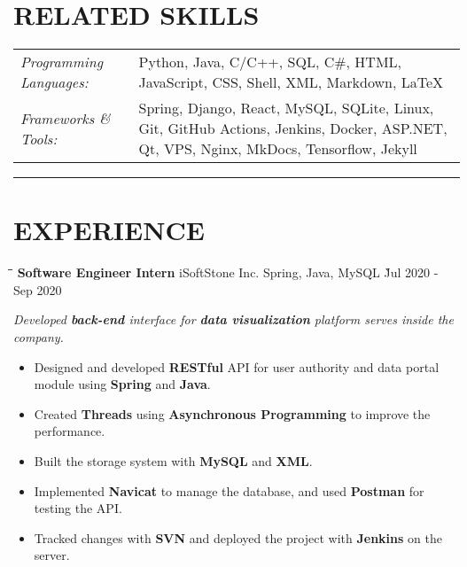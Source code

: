 \documentclass{res}
\begin{document}
\begin{resume}
\vspace{-0.2in}
\section{RELATED SKILLS}  
    \vspace{+0.15in}
    \hspace{-0.12in} 
    \begin{tabular}{l p{4.6in}}
    {\sl Programming Languages:} & Python, Java, C/C++, SQL, C\#, HTML, JavaScript, CSS, 
                        Shell, XML, Markdown, LaTeX \\ 
    \rule{0in}{0.2in}
    {\sl Frameworks \& Tools:} & Spring, Django, React, MySQL, SQLite, Linux, Git, 
                        GitHub Actions, Jenkins, Docker, ASP.NET, Qt, VPS, Nginx, 
                        MkDocs, Tensorflow, Jekyll
    \end{tabular}   

\vspace{-5pt}
\hspace{-0.55in}
\noindent\rule[0.25\baselineskip]{19.36cm}{0.5pt}    

\vspace{-0.2in}
\section{EXPERIENCE}
    \vspace{-0.05in}	
    \begin{tabbing}
    \hspace{2.6in}\= \hspace{1.5in}\= \hspace{1.6in}\= \kill %
    {\bf Software Engineer Intern} \> iSoftStone Inc. \>  
                                        Spring, Java, MySQL    \` Jul 2020 - Sep 2020\\
    \end{tabbing}\vspace{-20pt}      %
    \vspace{-0.15in}
    \textit{Developed {\bf back-end} interface for {\bf data visualization} 
                platform serves inside the company.}
    \vspace{+0.05in}
    \begin{itemize} \itemsep 0.5pt %
        \item Designed and developed {\bf RESTful} API for user authority and 
                data portal module using {\bf Spring} and {\bf Java}.
        \item Created {\bf Threads} using {\bf Asynchronous Programming} to 
                improve the performance.
        \item Built the storage system with {\bf MySQL} and {\bf XML}.
        \item Implemented {\bf Navicat} to manage the database, and used {\bf Postman} for testing the API.
        \item Tracked changes with {\bf SVN} and deployed the project with {\bf Jenkins} 
                on the server.
    \end{itemize}


\end{resume}
\end{document}
